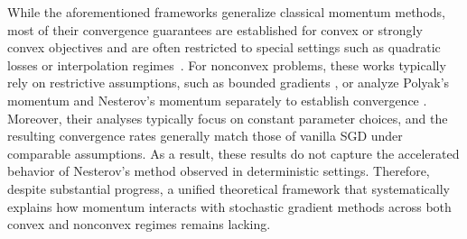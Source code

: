 \documentclass[10pt]{article}
\numberwithin{equation}{section}
\theoremstyle{definition}
\begin{document}
While the aforementioned frameworks generalize classical momentum methods, most of their convergence guarantees are established for convex or strongly convex objectives and are often restricted to special settings such as quadratic losses or interpolation regimes~\citep{liu2018accelerating}. For nonconvex problems, these works typically rely on restrictive assumptions, such as bounded gradients \citep{yan2018unified,yang2016unified}, or analyze Polyak’s momentum and Nesterov’s momentum separately to establish convergence \citep{yu2019linear}. Moreover, their analyses typically focus on constant parameter choices, and the resulting convergence rates generally match those of vanilla SGD under comparable assumptions. As a result, these results do not capture the accelerated behavior of Nesterov’s method observed in deterministic settings.
Therefore, despite substantial progress, a unified theoretical framework that systematically explains how momentum interacts with stochastic gradient methods across both convex and nonconvex regimes remains lacking.
%
\end{document}
